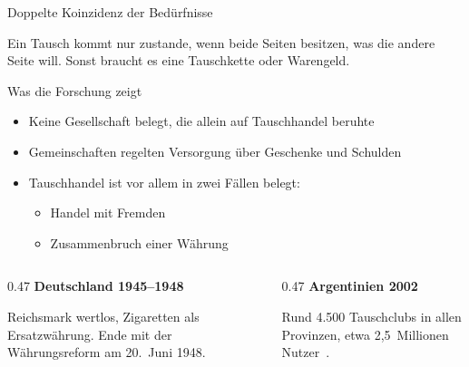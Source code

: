 \documentclass[aspectratio=169, 11pt]{beamer}
\begin{document}
\begin{frame}{Doppelte Koinzidenz der Bedürfnisse}
    \centering
    \vspace{0.5cm}

    \small Ein Tausch kommt nur zustande, wenn beide Seiten besitzen, was die
    andere Seite will. Sonst braucht es eine Tauschkette oder Warengeld.
\end{frame}

\begin{frame}{Was die Forschung zeigt}
    \begin{itemize}
        \item Keine Gesellschaft belegt, die allein auf Tauschhandel
              beruhte~\cite{humphrey1985}
        \item Gemeinschaften regelten Versorgung über Geschenke und
              Schulden~\cite{graeber2011}
        \item Tauschhandel ist vor allem in zwei Fällen belegt:
        \begin{itemize}
            \item Handel mit Fremden
            \item Zusammenbruch einer Währung
        \end{itemize}
    \end{itemize}
    \vspace{0.3cm}
    \begin{columns}[T]
        \begin{column}{0.47\textwidth}
            {\color{hkared}\bfseries Deutschland 1945--1948}\par\small
            Reichsmark wertlos, Zigaretten als Ersatzwährung. Ende mit der
            Währungsreform am 20.~Juni 1948.
        \end{column}
        \begin{column}{0.47\textwidth}
            {\color{hkared}\bfseries Argentinien 2002}\par\small
            Rund 4.500 Tauschclubs in allen Provinzen, etwa 2,5~Millionen
            Nutzer~\cite{ambito2002}.
        \end{column}
    \end{columns}
\end{frame}
\end{document}
